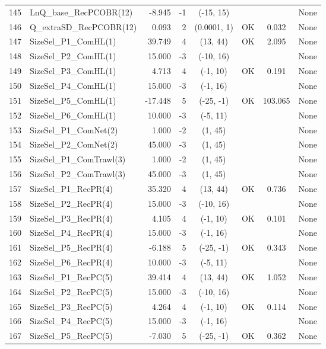 \documentclass[12pt,]{article}
\begin{document}
\begin{landscape}
\begin{longtable}{rlrrcccl}
  145 & LnQ\_base\_RecPCOBR(12) & -8.945 & -1 & (-15, 15) &  &  & None \\ 
  146 & Q\_extraSD\_RecPCOBR(12) & 0.093 & 2 & (0.0001, 1) & OK & 0.032 & None \\ 
  147 & SizeSel\_P1\_ComHL(1) & 39.749 & 4 & (13, 44) & OK & 2.095 & None \\ 
  148 & SizeSel\_P2\_ComHL(1) & 15.000 & -3 & (-10, 16) &  &  & None \\ 
  149 & SizeSel\_P3\_ComHL(1) & 4.713 & 4 & (-1, 10) & OK & 0.191 & None \\ 
  150 & SizeSel\_P4\_ComHL(1) & 15.000 & -3 & (-1, 16) &  &  & None \\ 
  151 & SizeSel\_P5\_ComHL(1) & -17.448 & 5 & (-25, -1) & OK & 103.065 & None \\ 
  152 & SizeSel\_P6\_ComHL(1) & 10.000 & -3 & (-5, 11) &  &  & None \\ 
  153 & SizeSel\_P1\_ComNet(2) & 1.000 & -2 & (1, 45) &  &  & None \\ 
  154 & SizeSel\_P2\_ComNet(2) & 45.000 & -3 & (1, 45) &  &  & None \\ 
  155 & SizeSel\_P1\_ComTrawl(3) & 1.000 & -2 & (1, 45) &  &  & None \\ 
  156 & SizeSel\_P2\_ComTrawl(3) & 45.000 & -3 & (1, 45) &  &  & None \\ 
  157 & SizeSel\_P1\_RecPR(4) & 35.320 & 4 & (13, 44) & OK & 0.736 & None \\ 
  158 & SizeSel\_P2\_RecPR(4) & 15.000 & -3 & (-10, 16) &  &  & None \\ 
  159 & SizeSel\_P3\_RecPR(4) & 4.105 & 4 & (-1, 10) & OK & 0.101 & None \\ 
  160 & SizeSel\_P4\_RecPR(4) & 15.000 & -3 & (-1, 16) &  &  & None \\ 
  161 & SizeSel\_P5\_RecPR(4) & -6.188 & 5 & (-25, -1) & OK & 0.343 & None \\ 
  162 & SizeSel\_P6\_RecPR(4) & 10.000 & -3 & (-5, 11) &  &  & None \\ 
  163 & SizeSel\_P1\_RecPC(5) & 39.414 & 4 & (13, 44) & OK & 1.052 & None \\ 
  164 & SizeSel\_P2\_RecPC(5) & 15.000 & -3 & (-10, 16) &  &  & None \\ 
  165 & SizeSel\_P3\_RecPC(5) & 4.264 & 4 & (-1, 10) & OK & 0.114 & None \\ 
  166 & SizeSel\_P4\_RecPC(5) & 15.000 & -3 & (-1, 16) &  &  & None \\ 
  167 & SizeSel\_P5\_RecPC(5) & -7.030 & 5 & (-25, -1) & OK & 0.362 & None \\ 

\end{longtable}
\end{landscape}
\end{document}
